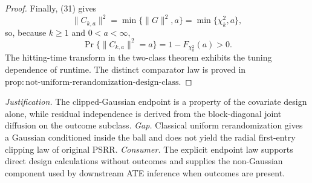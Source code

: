 \documentclass{article}
\begin{document}
\begin{proof}
Finally, (31) gives
\[
 \|C_{k,a}\|^2=\min\{\|G\|^2,a\}=\min\{\chi_k^2,a\}, \tag{37}
\]
so, because \(k\ge1\) and \(0<a<\infty\),
\[
 \Pr\{\|C_{k,a}\|^2=a\}=1-F_{\chi_k^2}(a)>0. \tag{38}
\]
The hitting-time transform in the two-class theorem exhibits the tuning dependence of runtime.  The distinct comparator law is proved in \(\mathrm{prop{:}not\mbox{-}uniform\mbox{-}rerandomization\mbox{-}design\mbox{-}class}\).
\end{proof}
\par\smallskip\noindent \textit{Justification.} The clipped-Gaussian endpoint is a property of the covariate design alone, while residual independence is derived from the block-diagonal joint diffusion on the outcome subclass. \textit{Gap.} Classical uniform rerandomization gives a Gaussian conditioned inside the ball and does not yield the radial first-entry clipping law of original PSRR. \textit{Consumer.} The explicit endpoint law supports direct design calculations without outcomes and supplies the non-Gaussian component used by downstream ATE inference when outcomes are present.
\end{document}
